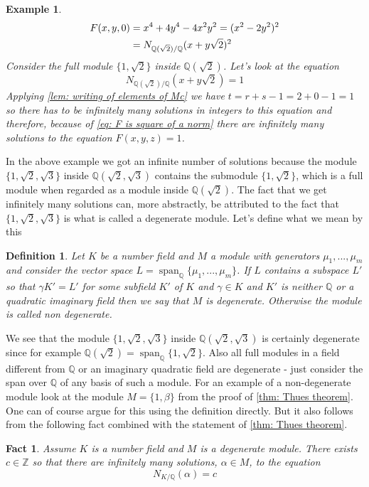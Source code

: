 \documentclass{article}
\newcommand{\Span}{\operatorname{span}}
\newtheorem{definition}{Definition}[section]
\newtheorem{example}{Example}[section]
\newtheorem{fact}{Fact}[section]
\newcommand{\mbb}[1]{\mathbb{#1}}
\begin{document}
\begin{example}
\begin{align}\label{eq: F is square of a norm}
    F(x,y,0) &= x^4 + 4y^4 - 4x^2y^2 = (x^2 - 2y^2)^2  \\
    &= N_{\mbb Q(\sqrt 2) / \mbb Q}(x + y \sqrt 2)^2 \notag
\end{align}
Consider the full module $\{1, \sqrt 2\}$ inside $\mbb Q(\sqrt 2)$. Let's look at the equation 
$$N_{\mbb Q(\sqrt 2) / \mbb Q}(x + y \sqrt 2) = 1$$
Applying \cref{lem: writing of elements of Mc} we have $t = r+s -1 =  2 + 0 - 1 = 1$ so there has to be infinitely many solutions in integers to this equation and therefore, because of \cref{eq: F is square of a norm} there are infinitely many solutions to the equation $F(x, y, z) = 1$. 
\end{example}
In the above example we got an infinite number of solutions because the module $\{1, \sqrt 2, \sqrt 3 \}$ inside $\mbb Q(\sqrt 2, \sqrt 3)$ contains the submodule $\{1, \sqrt 2\}$, which is a full module when regarded as a module inside $\mbb Q(\sqrt 2)$. The fact that we get infinitely many solutions can, more abstractly, be attributed to the fact that $\{1, \sqrt 2, \sqrt 3 \}$ is what is called a degenerate module. Let's define what we mean by this
\begin{definition}\label{def: Degenerate module}
    Let $K$ be a number field and $M$ a module with generators $\mu_1, ..., \mu_m$ and consider the vector space $L = \Span_{\mbb Q}\{\mu_1, ..., \mu_m \}$. If $L$ contains a subspace $L'$ so that $\gamma K' = L'$ for some subfield $K'$ of $K$ and $\gamma \in K$ and $K'$ is neither $\mbb Q$ or a quadratic imaginary field then we say that $M$ is degenerate. Otherwise the module is called non degenerate.
\end{definition}
We see that the module $\{1, \sqrt 2, \sqrt 3 \}$ inside $\mbb Q(\sqrt 2, \sqrt 3)$ is certainly degenerate since for example $\mbb Q(\sqrt 2) = \Span_{\mbb Q} \{1, \sqrt 2 \}$. Also all full modules in a field different from $\mbb Q$ or an imaginary quadratic field are degenerate - just consider the span over $\mbb Q$ of any basis of such a module. For an example of a non-degenerate module look at the module $M = \{1, \beta \}$ from the proof of \cref{thm: Thues theorem}. One can of course argue for this using the definition directly. But it also follows from the following fact combined with the statement of \cref{thm: Thues theorem}.
\begin{fact}
    Assume $K$ is a number field and $M$ is a degenerate module. There exists $c \in \mbb Z$ so that there are infinitely many solutions, $\alpha \in M$, to the equation
    $$N_{K / \mbb Q}(\alpha) = c$$
\end{fact}
\end{document}
